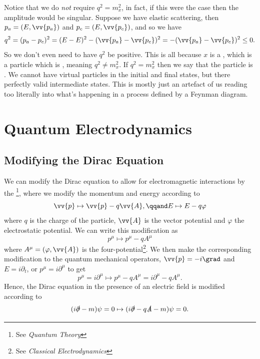 \documentclass[fleqn]{NotesClass}
\newcommand{\course}[1]{\textit{#1}}
\begin{document}
    Notice that we do \emph{not} require \(q^2 = m_x^2\), in fact, if this were the case then the amplitude would be singular.
    Suppose we have elastic scattering, then \(p_a = (E, \vv{p_a})\) and \(p_c = (E, \vv{p_c})\), and so we have
    \begin{equation}
        q^2 = (p_a - p_c)^2 = (E - E)^2 - (\vv{p_a} - \vv{p_c})^2 = -(\vv{p_a} - \vv{p_c})^2 \le 0.
    \end{equation}
    So we don't even need to have \(q^2\) be positive.
    This is all because \(x\) is a , which is a particle which is , meaning \(q^2 \ne m_x^2\).
    If \(q^2 = m_x^2\) then we say that the particle is .
    We cannot have virtual particles in the initial and final states, but there perfectly valid intermediate states.
    This is mostly just an artefact of us reading too literally into what's happening in a process defined by a Feynman diagram.
    
    \chapter{Quantum Electrodynamics}
    \section{Modifying the Dirac Equation}
    We can modify the Dirac equation to allow for electromagnetic interactions by the \footnote{See \course{Quantum Theory}}, where we modify the momentum and energy according to
    \begin{equation}
        \vv{p} \mapsto \vv{p} - q\vv{A}, \qqand E \mapsto E - q\varphi
    \end{equation}
    where \(q\) is the charge of the particle, \(\vv{A}\) is the vector potential and \(\varphi\) the electrostatic potential.
    We can write this modification as
    \begin{equation}
        p^\mu \mapsto p^\mu - qA^\mu
    \end{equation}
    where \(A^\mu = (\varphi, \vv{A})\) is the four-potential\footnote{See \course{Classical Electrodynamics}}.
    We then make the corresponding modification to the quantum mechanical operators, \(\vv{p} = -i\grad\) and \(E = i\partial_t\), or \(p^\mu = i\partial^\mu\) to get
    \begin{equation}
        p^\mu = i\partial^\mu \mapsto p^\mu - qA^\mu = i\partial^\mu - qA^\mu.
    \end{equation}
    Hence, the Dirac equation in the presence of an electric field is modified according to
    \begin{equation}
        (i\slashed{\partial} - m)\psi = 0 \mapsto (i\slashed{\partial} - q\slashed{A} - m)\psi = 0.
    \end{equation}
    
\end{document}

